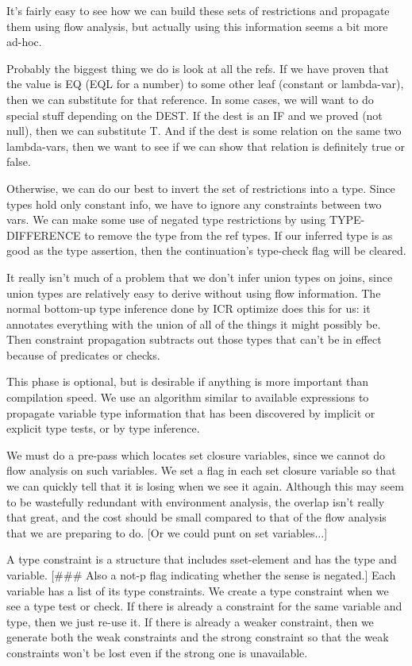 It's fairly easy to see how we can build these sets of restrictions and
propagate them using flow analysis, but actually using this information seems
a bit more ad-hoc.  

Probably the biggest thing we do is look at all the refs.  If we have proven that
the value is EQ (EQL for a number) to some other leaf (constant or lambda-var),
then we can substitute for that reference.  In some cases, we will want to do
special stuff depending on the DEST.  If the dest is an IF and we proved (not
null), then we can substitute T.  And if the dest is some relation on the same
two lambda-vars, then we want to see if we can show that relation is definitely
true or false.

Otherwise, we can do our best to invert the set of restrictions into a type.
Since types hold only constant info, we have to ignore any constraints between
two vars.  We can make some use of negated type restrictions by using
TYPE-DIFFERENCE to remove the type from the ref types.  If our inferred type is
as good as the type assertion, then the continuation's type-check flag will be
cleared.

It really isn't much of a problem that we don't infer union types on joins,
since union types are relatively easy to derive without using flow information.
The normal bottom-up type inference done by ICR optimize does this for us: it
annotates everything with the union of all of the things it might possibly be.
Then constraint propagation subtracts out those types that can't be in effect
because of predicates or checks.



This phase is optional, but is desirable if anything is more important than
compilation speed.  We use an algorithm similar to available expressions to
propagate variable type information that has been discovered by implicit or
explicit type tests, or by type inference.

We must do a pre-pass which locates set closure variables, since we cannot do
flow analysis on such variables.  We set a flag in each set closure variable so
that we can quickly tell that it is losing when we see it again.  Although this
may seem to be wastefully redundant with environment analysis, the overlap
isn't really that great, and the cost should be small compared to that of the
flow analysis that we are preparing to do.  [Or we could punt on set
variables...]

A type constraint is a structure that includes sset-element and has the type
and variable.  
[\#\#\# Also a not-p flag indicating whether the sense is negated.]
  Each variable has a list of its type constraints.  We create a
type constraint when we see a type test or check.  If there is already a
constraint for the same variable and type, then we just re-use it.  If there is
already a weaker constraint, then we generate both the weak constraints and the
strong constraint so that the weak constraints won't be lost even if the strong
one is unavailable.

